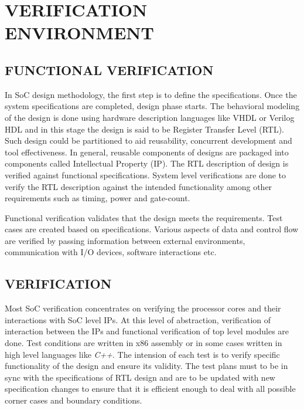 \chapter{VERIFICATION ENVIRONMENT}
\label{chap:verification.tex}

\section {FUNCTIONAL VERIFICATION}

In SoC design methodology, the first step is to define the specifications. Once the system specifications are completed, design phase starts. The behavioral modeling of the design is done using hardware description languages like VHDL or Verilog HDL and in this stage the design is said to be Register Transfer Level (RTL). Such design could be partitioned to aid reusability, concurrent development and tool effectiveness. In general, reusable components of designs are packaged into components called Intellectual Property (IP). The RTL description of design is verified against functional specifications. System level verifications are done to verify the RTL description against the intended functionality among other requirements such as timing, power and gate-count. 



Functional verification validates that the design meets the requirements. Test cases are created based on specifications. Various aspects of data and control flow are verified by passing information between external environments, communication with I/O devices,  software interactions etc. 
 
\section {VERIFICATION}

Most SoC verification concentrates on verifying the processor cores and their interactions with SoC level IPs. At this level of abstraction, verification of interaction between the IPs and functional verification of top level modules are done.  Test conditions are written in x86 assembly or in some cases written in high level languages like {\it C++}. The intension of each test is to verify specific functionality of the design and ensure its validity. The test plans must to be in sync with the specifications of RTL design and are to be updated with new specification changes to ensure that it is efficient enough to deal with all possible corner cases and boundary conditions.

